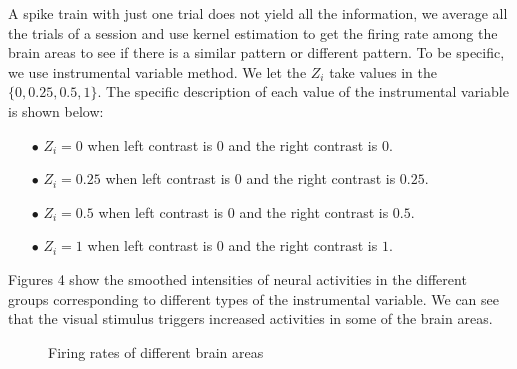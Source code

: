 \documentclass[12pt]{article}
\begin{document}
A spike train with just one trial does not yield all the information, we average all the trials of a session and use kernel estimation to get the firing rate among the brain areas to see if there is a similar pattern or different pattern. To be specific, we use instrumental variable method. We let the $Z_{i}$ take values in the $\{0,0.25,0.5,1\}$. The specific description of each value of the instrumental variable is shown below:
\begin{itemize}
\item[$\bullet$] $Z_{i}=0$ when left contrast is $0$ and the right contrast is $0$.
\item[$\bullet$] $Z_{i}=0.25$ when left contrast is $0$ and the right contrast is $0.25$.
\item[$\bullet$] $Z_{i}=0.5$ when left contrast is $0$ and the right contrast is $0.5$.
\item[$\bullet$] $Z_{i}=1$ when left contrast is $0$ and the right contrast is $1$. 
\end{itemize}

Figures 4 show the smoothed intensities of neural activities in the different groups corresponding to different types of the instrumental variable. We can see that the visual stimulus triggers increased activities in some of the brain areas.

\begin{figure}[hb]
  \centering
  \caption{Firing rates of different brain areas}
\end{figure}
\end{document}
